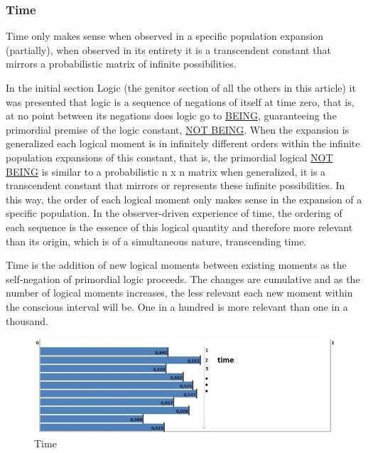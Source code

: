 \subsubsection{Time}
Time only makes sense when observed in a specific population expansion (partially), when observed in its entirety it is a transcendent constant that mirrors a probabilistic matrix of infinite possibilities.

In the initial section Logic (the genitor section of all the others in this article) it was presented that logic is a sequence of negations of itself at time zero, that is, at no point between its negations does logic go to \underline{BEING}, guaranteeing the primordial premise of the logic constant, \underline{NOT BEING}. When the expansion is generalized each logical moment is in infinitely different orders within the infinite population expansions of this constant, that is, the primordial logical \underline{NOT BEING} is similar to a probabilistic n x n matrix when generalized, it is a transcendent constant that mirrors or represents these infinite possibilities. In this way, the order of each logical moment only makes sense in the expansion of a specific population. In the observer-driven experience of time, the ordering of each sequence is the essence of this logical quantity and therefore more relevant than its origin, which is of a simultaneous nature, transcending time.

Time is the addition of new logical moments between existing moments as the self-negation of primordial logic proceeds. The changes are cumulative and as the number of logical moments increases, the less relevant each new moment within the conscious interval will be. One in a hundred is more relevant than one in a thousand. 
	\begin{figure}[H]
	\caption{Time}
	\label{fig:consciousness_time}
	\centering
	\includegraphics[scale=.8]{sections/images/consciousness_time.jpg}
	\end{figure}

